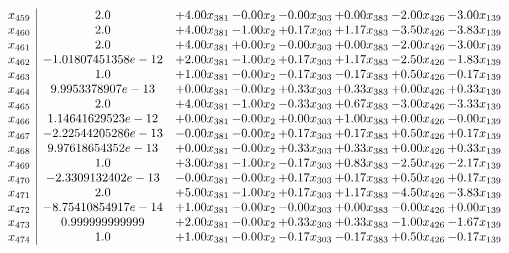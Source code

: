 \documentclass[8pt]{article}
\begin{document}
\[\begin{array}{c| c c@{\hskip 2pt} c@{\hskip 2pt} c@{\hskip 2pt} c@{\hskip 2pt} c@{\hskip 2pt} c@{\hskip 2pt} }
 x_{459}   &  2.0 & +  4.00 x_{381} & -0.00 x_{2} & -0.00 x_{303} & +  0.00 x_{383} & -2.00 x_{426} & -3.00 x_{139}\\
 x_{460}   &  2.0 & +  4.00 x_{381} & -1.00 x_{2} & +  0.17 x_{303} & +  1.17 x_{383} & -3.50 x_{426} & -3.83 x_{139}\\
 x_{461}   &  2.0 & +  4.00 x_{381} & +  0.00 x_{2} & -0.00 x_{303} & +  0.00 x_{383} & -2.00 x_{426} & -3.00 x_{139}\\
 x_{462}   &  -1.01807451358e-12 & +  2.00 x_{381} & -1.00 x_{2} & +  0.17 x_{303} & +  1.17 x_{383} & -2.50 x_{426} & -1.83 x_{139}\\
 x_{463}   &  1.0 & +  1.00 x_{381} & -0.00 x_{2} & -0.17 x_{303} & -0.17 x_{383} & +  0.50 x_{426} & -0.17 x_{139}\\
 x_{464}   &  9.9953378907e-13 & +  0.00 x_{381} & -0.00 x_{2} & +  0.33 x_{303} & +  0.33 x_{383} & +  0.00 x_{426} & +  0.33 x_{139}\\
 x_{465}   &  2.0 & +  4.00 x_{381} & -1.00 x_{2} & -0.33 x_{303} & +  0.67 x_{383} & -3.00 x_{426} & -3.33 x_{139}\\
 x_{466}   &  1.14641629523e-12 & +  0.00 x_{381} & -0.00 x_{2} & +  0.00 x_{303} & +  1.00 x_{383} & +  0.00 x_{426} & -0.00 x_{139}\\
 x_{467}   &  -2.22544205286e-13 & -0.00 x_{381} & -0.00 x_{2} & +  0.17 x_{303} & +  0.17 x_{383} & +  0.50 x_{426} & +  0.17 x_{139}\\
 x_{468}   &  9.97618654352e-13 & +  0.00 x_{381} & -0.00 x_{2} & +  0.33 x_{303} & +  0.33 x_{383} & +  0.00 x_{426} & +  0.33 x_{139}\\
 x_{469}   &  1.0 & +  3.00 x_{381} & -1.00 x_{2} & -0.17 x_{303} & +  0.83 x_{383} & -2.50 x_{426} & -2.17 x_{139}\\
 x_{470}   &  -2.3309132402e-13 & -0.00 x_{381} & -0.00 x_{2} & +  0.17 x_{303} & +  0.17 x_{383} & +  0.50 x_{426} & +  0.17 x_{139}\\
 x_{471}   &  2.0 & +  5.00 x_{381} & -1.00 x_{2} & +  0.17 x_{303} & +  1.17 x_{383} & -4.50 x_{426} & -3.83 x_{139}\\
 x_{472}   &  -8.75410854917e-14 & +  1.00 x_{381} & -0.00 x_{2} & -0.00 x_{303} & +  0.00 x_{383} & -0.00 x_{426} & +  0.00 x_{139}\\
 x_{473}   &  0.999999999999 & +  2.00 x_{381} & -0.00 x_{2} & +  0.33 x_{303} & +  0.33 x_{383} & -1.00 x_{426} & -1.67 x_{139}\\
 x_{474}   &  1.0 & +  1.00 x_{381} & -0.00 x_{2} & -0.17 x_{303} & -0.17 x_{383} & +  0.50 x_{426} & -0.17 x_{139}\\

\end{array}\]
\end{document}
